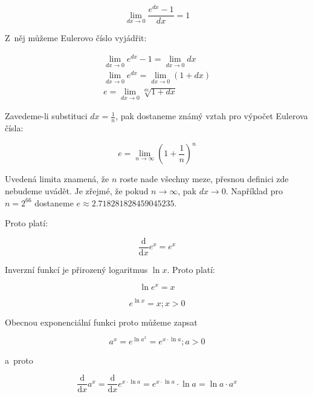\begin{equation}
\lim_{dx \to 0} \frac{e^{dx} - 1}{dx} = 1
\end{equation}

Z~něj můžeme Eulerovo číslo vyjádřit:

\begin{equation}
\begin{split}
\lim_{dx \to 0} e^{dx} - 1 = \lim_{dx \to 0} dx \\
\lim_{dx \to 0} e^{dx} = \lim_{dx \to 0} (1 + dx) \\
e = \lim_{dx \to 0} \sqrt[dx]{1 + dx}
\end{split}
\end{equation}

Zavedeme-li substituci \(dx = \frac{1}{n}\), pak dostaneme známý vztah pro výpočet Eulerova čísla:

\begin{equation}
e = \lim_{n \to \infty} \left(1 + \frac{1}{n}\right)^n
\end{equation}

Uvedená limita znamená, že \(n\) roste nade všechny meze, přesnou definici zde nebudeme uvádět. Je zřejmé, že pokud \(n \to \infty\), pak \(dx \to 0\). Například pro \(n = 2^{66}\) dostaneme \(e \approx 2.718281828459045235\).

Proto platí:

\begin{equation}
\frac{\mathrm{d}}{\mathrm{d}x} e^x = e^x
\end{equation}

Inverzní funkcí je přirozený logaritmus \(\ln x\). Proto platí:

\begin{equation}
\ln e^x = x
\end{equation}

\begin{equation}
e^{\ln x} = x; x > 0
\end{equation}

Obecnou exponenciální funkci proto můžeme zapsat

\begin{equation}
a^x = e^{\ln a^x} = e^{x \cdot \ln a}; a > 0
\end{equation}

a~proto

\begin{equation}
\frac{\mathrm{d}}{\mathrm{d}x} a^x = \frac{\mathrm{d}}{\mathrm{d}x} e^{x \cdot \ln a} = e^{x \cdot \ln a} \cdot \ln a = \ln a \cdot a^x
\end{equation}

